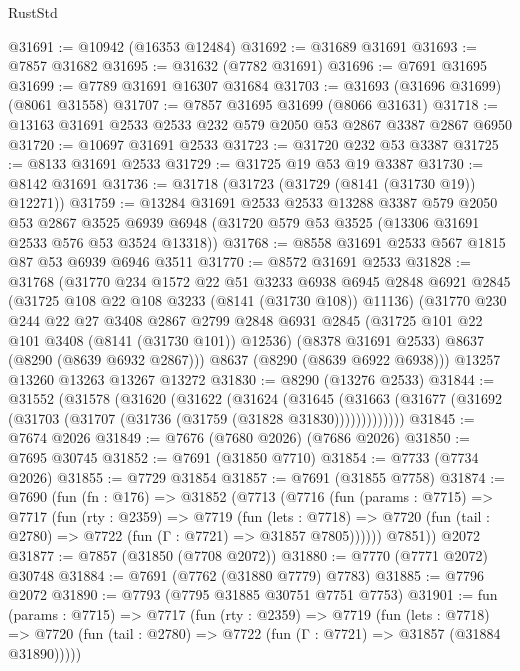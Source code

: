\begin{lexlean}{RustStd}
\begin{coremodule}
@31691 := @10942 (@16353 @12484)
@31692 := @31689 @31691
@31693 := @7857 @31682
@31695 := @31632 (@7782 @31691)
@31696 := @7691 @31695
@31699 := @7789 @31691 @16307 @31684
@31703 := @31693 (@31696 @31699) (@8061 @31558)
@31707 := @7857 @31695 @31699 (@8066 @31631)
@31718 := @13163 @31691 @2533 @2533 @232 @579 @2050 @53 @2867 @3387 @2867 @6950
@31720 := @10697 @31691 @2533
@31723 := @31720 @232 @53 @3387
@31725 := @8133 @31691 @2533
@31729 := @31725 @19 @53 @19 @3387
@31730 := @8142 @31691
@31736 := @31718 (@31723 (@31729 (@8141 (@31730 @19)) @12271))
@31759 := @13284
    @31691
    @2533
    @2533
    @13288
    @3387
    @579
    @2050
    @53
    @2867
    @3525
    @6939
    @6948
    (@31720 @579 @53 @3525 (@13306 @31691 @2533 @576 @53 @3524 @13318))
@31768 := @8558 @31691 @2533 @567 @1815 @87 @53 @6939 @6946 @3511
@31770 := @8572 @31691 @2533
@31828 := @31768
    (@31770
      @234
      @1572
      @22
      @51
      @3233
      @6938
      @6945
      @2848
      @6921
      @2845
      (@31725 @108 @22 @108 @3233 (@8141 (@31730 @108)) @11136)
      (@31770
        @230
        @244
        @22
        @27
        @3408
        @2867
        @2799
        @2848
        @6931
        @2845
        (@31725 @101 @22 @101 @3408 (@8141 (@31730 @101)) @12536)
        (@8378 @31691 @2533)
        @8637
        (@8290 (@8639 @6932 @2867)))
      @8637
      (@8290 (@8639 @6922 @6938)))
    @13257
    @13260
    @13263
    @13267
    @13272
@31830 := @8290 (@13276 @2533)
@31844 := @31552
    (@31578
      (@31620
        (@31622
          (@31624
            (@31645
              (@31663 (@31677 (@31692 (@31703 (@31707 (@31736 (@31759 (@31828 @31830)))))))))))))
@31845 := @7674 @2026
@31849 := @7676 (@7680 @2026) (@7686 @2026)
@31850 := @7695 @30745
@31852 := @7691 (@31850 @7710)
@31854 := @7733 (@7734 @2026)
@31855 := @7729 @31854
@31857 := @7691 (@31855 @7758)
@31874 := @7690
    (fun (fn : @176) =>
    @31852
      (@7713
        (@7716
          (fun (params : @7715) =>
          @7717
            (fun (rty : @2359) =>
            @7719
              (fun (lets : @7718) =>
              @7720 (fun (tail : @2780) => @7722 (fun (Γ : @7721) => @31857 @7805))))))
        @7851))
    @2072
@31877 := @7857 (@31850 (@7708 @2072))
@31880 := @7770 (@7771 @2072) @30748
@31884 := @7691 (@7762 (@31880 @7779) @7783)
@31885 := @7796 @2072
@31890 := @7793 (@7795 @31885 @30751 @7751 @7753)
@31901 := fun (params : @7715) =>
  @7717
    (fun (rty : @2359) =>
    @7719
      (fun (lets : @7718) =>
      @7720 (fun (tail : @2780) => @7722 (fun (Γ : @7721) => @31857 (@31884 @31890)))))

\end{coremodule}
\end{lexlean}

